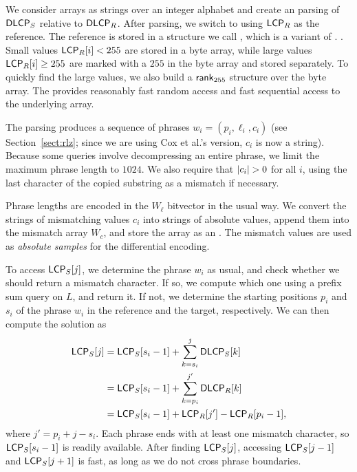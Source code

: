 We consider \DLCP{} arrays as strings over an integer alphabet and create an \RLZ{} parsing
of $\mathsf{DLCP}_{S}$ relative to $\mathsf{DLCP}_{R}$. After parsing, we switch to using
$\mathsf{LCP}_{R}$ as the reference. The reference is stored in a
structure we call \slarray, which is a variant of \LCPbyte.
\cite{Abouelhoda2004}. Small values $\mathsf{LCP}_{R}[i] < 255$ are stored in a byte
array, while large values $\mathsf{LCP}_{R}[i] \ge 255$ are marked with a $255$ in the
byte array and stored separately. To quickly find the large values, we also
build a $\mathsf{rank}_{255}$ structure over the byte array. The \slarray{} provides
reasonably fast random access and fast sequential access to the
underlying array.

The \RLZ{} parsing produces a sequence of phrases $w_{i} = (p_{i}, \ell_{i},
c_{i})$ (see Section~\ref{sect:rlz}; since we are using Cox et al.'s version, $c_{i}$ is now a string).
Because some queries involve decompressing an entire phrase, we limit the maximum phrase length to $1024$.
We also require that $\lvert c_{i} \rvert > 0$ for all $i$, using the last character of the copied substring
as a mismatch if necessary.

Phrase lengths are encoded in the $W_{\ell}$ bitvector in the usual way. We convert the strings of mismatching
\DLCP{} values $c_{i}$ into strings of absolute \LCP{} values, append them into the mismatch array $W_{c}$, and
store the array as an \slarray. The mismatch values are used as \emph{absolute
samples} for the differential encoding.

To access $\mathsf{LCP}_{S}[j]$, we determine the phrase $w_{i}$ as usual, and check whether we should return a mismatch character. If so, we compute which one using a prefix sum query on $L$, and return it.  If not, we determine the starting positions $p_{i}$ and $s_{i}$ of the phrase $w_{i}$ in the reference and the target, respectively. We can then compute the solution as
\begin{align*}
\mathsf{LCP}_{S}[j] &= \mathsf{LCP}_{S}[s_{i} - 1] + \sum_{k = s_{i}}^{j} \mathsf{DLCP}_{S}[k] \\
&= \mathsf{LCP}_{S}[s_{i} - 1] + \sum_{k = p_{i}}^{j'} \mathsf{DLCP}_{R}[k] \\
&= \mathsf{LCP}_{S}[s_{i} - 1] + \mathsf{LCP}_{R}[j'] - \mathsf{LCP}_{R}[p_{i} - 1],
\end{align*}
where $j' = p_{i} + j - s_{i}$.
Each \RLZ{} phrase ends with at least one mismatch character, so $\mathsf{LCP}_{S}[s_{i} - 1]$ is readily available. After finding $\mathsf{LCP}_{S}[j]$, accessing $\mathsf{LCP}_{S}[j-1]$ and $\mathsf{LCP}_{S}[j+1]$ is fast, as long as we do not cross phrase boundaries.

